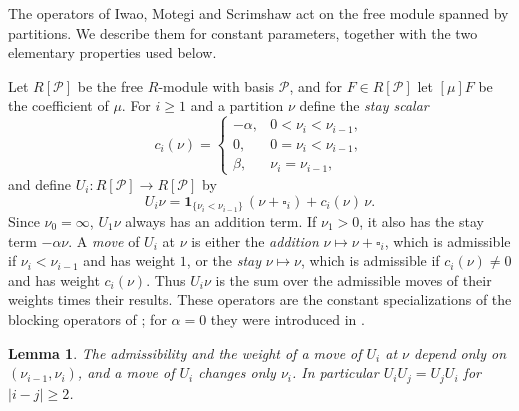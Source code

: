 \documentclass[11pt]{amsart}
\DeclareRobustCommand{\S}{\ensuremath{\mathsection}}
\numberwithin{equation}{section}
\newtheorem{lemma}[theorem]{Lemma}
\theoremstyle{definition}
\theoremstyle{remark}
\newcommand{\Par}{\mathcal P}
\newcommand{\ind}{\mathbf 1}
\begin{document}
The operators of Iwao, Motegi and Scrimshaw act on the free module spanned
by partitions. We describe them for constant parameters, together with
the two elementary properties used below.

Let $R[\Par]$ be the free $R$-module with basis $\Par$, and for
$F\in R[\Par]$ let $[\mu]F$ be the coefficient of $\mu$. For $i\geq1$ and a
partition $\nu$ define the \emph{stay scalar}
\begin{equation}\label{eq:stay-scalar}
 c_i(\nu)=
 \begin{cases}
  -\alpha,&0<\nu_i<\nu_{i-1},\\
  0,&0=\nu_i<\nu_{i-1},\\
  \beta,&\nu_i=\nu_{i-1},
 \end{cases}
\end{equation}
and define $U_i\colon R[\Par]\to R[\Par]$ by
\begin{equation}\label{eq:Ui}
 U_i\nu=\ind_{\{\nu_i<\nu_{i-1}\}}\,(\nu+\square_i)+c_i(\nu)\,\nu .
\end{equation}
Since $\nu_0=\infty$, $U_1\nu$ always has an addition term. If
$\nu_1>0$, it also has the stay term $-\alpha\nu$. A \emph{move}
of $U_i$ at $\nu$ is either the \emph{addition} $\nu\mapsto\nu+\square_i$,
which is admissible if $\nu_i<\nu_{i-1}$ and has weight $1$, or the
\emph{stay} $\nu\mapsto\nu$, which is admissible if $c_i(\nu)\neq0$ and has
weight $c_i(\nu)$. Thus $U_i\nu$ is the sum over the admissible moves of
their weights times their results. These operators are the constant
specializations of the blocking operators of \cite[\S3.1]{IMS25}; for
$\alpha=0$ they were introduced in \cite[\S6]{Iwao20}.

\begin{lemma}\label{lem:local}
The admissibility and the weight of a move of $U_i$ at $\nu$ depend only on
$(\nu_{i-1},\nu_i)$, and a move of $U_i$ changes only $\nu_i$. In
particular $U_iU_j=U_jU_i$ for $|i-j|\geq2$.
\end{lemma}
\end{document}
